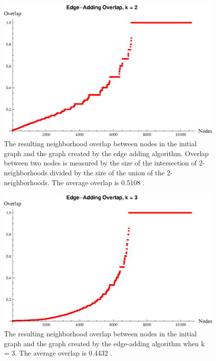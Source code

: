 \begin{figure}[htb]
\centerline{\includegraphics[scale=0.5]{s40_edge_add_k_2_overlap.eps}}
	\caption{The resulting neighborhood overlap between nodes in the initial graph and the graph created by the edge adding algorithm. Overlap between two nodes is measured by the size of the intersection of 2-neighborhoods divided by the size of the union of the 2-neighborhoods. The average overlap is 0.5108 . }
	\label{fig:edge-adding overlap k=2}
\end{figure}

\begin{figure}[htb]
\centerline{\includegraphics[scale=0.5]{s40_edge_add_k_3_overlap.eps}}
	\caption{The resulting neighborhood overlap between nodes in the initial graph and the graph created by the edge-adding algorithm when k = 3. The average overlap is 0.4432 . }
	\label{fig:edge-adding overlap k=3}
\end{figure}

